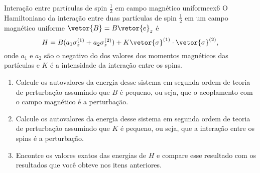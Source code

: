 \begin{exercício}{Interação entre partículas de spin \(\frac12\) em campo magnético uniforme}{ex6}
   O Hamiltoniano da interação entre duas partículas de spin \(\frac12\) em um campo magnético uniforme \(\vetor{B} = B \vetor{e}_z\) é
   \begin{equation*}
      H = B (a_1 \sigma_z^{(1)} + a_2 \sigma_z^{(2)}) + K \vetor{\sigma}^{(1)} \cdot \vetor{\sigma}^{(2)},
   \end{equation*}
   onde \(a_1\) e \(a_2\) são o negativo do dos valores dos momentos magnéticos das partículas e \(K\) é a intensidade da interação entre os spins.
   \begin{enumerate}[label=(\alph*)]
       \item Calcule os autovalores da energia desse sistema em segunda ordem de teoria de perturbação assumindo que \(B\) é pequeno, ou seja, que o acoplamento com o campo magnético é a perturbação.
       \item Calcule os autovalores da energia desse sistema em segunda ordem de teoria de perturbação assumindo que \(K\) é pequeno, ou seja, que a interação entre os spins é a perturbação.
       \item Encontre os valores exatos das energias de \(H\) e compare esse resultado com os resultados que você obteve nos itens anteriores.
   \end{enumerate}
\end{exercício}
